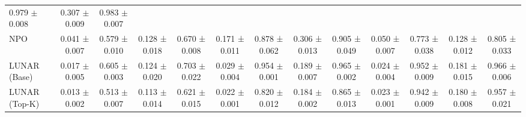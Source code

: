 \begin{table*}[h]
{\begin{tabular}{@{}lcccccccccccc@{}}
  0.979 $\pm$ 0.008 &
  0.307 $\pm$ 0.009 &
  0.983 $\pm$ 0.007 \\
NPO & 0.041 ± 0.007 & 0.579 ± 0.010 & 0.128 ± 0.018 & 0.670 ± 0.008 & 0.171 ± 0.011 & 0.878 ± 0.062 & 0.306 ± 0.013 & 0.905 ± 0.049 & 0.050 ± 0.007 & 0.773 ± 0.038 & 0.128 ± 0.012 & 0.805 ± 0.033 \\ 
\midrule   
LUNAR (Base) & 
0.017 $\pm$ 0.005 &
0.605 $\pm$ 0.003 &
0.124 $\pm$ 0.020 &
0.703 $\pm$ 0.022 &
0.029 $\pm$ 0.004 &
0.954 $\pm$ 0.001 &
0.189 $\pm$ 0.007&
0.965 $\pm$ 0.002&
0.024 $\pm$ 0.004 &
0.952 $\pm$ 0.009 &
0.181 $\pm$ 0.015 &
0.966 $\pm$ 0.006 \\
LUNAR (Top-K) &
0.013 $\pm$ 0.002&
0.513 $\pm$ 0.007&
0.113 $\pm$ 0.014&
0.621 $\pm$ 0.015&
0.022 $\pm$ 0.001&
0.820 $\pm$ 0.012&
0.184 $\pm$ 0.002&
0.865 $\pm$ 0.013&
0.023 $\pm$ 0.001 &
0.942 $\pm$ 0.009 &
0.180 $\pm$ 0.008 &
0.957 $\pm$ 0.021  
\\
\bottomrule
\end{tabular}
}
\label{tab:mrr}
\end{table*}